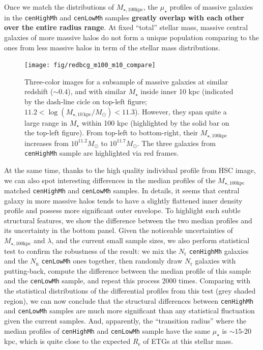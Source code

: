 \documentclass{emulateapj}
\def\rbcg{\texttt{cenHighMh}}
\def\nbcg{\texttt{cenLowMh}}
\def\mstar{{$M_{\star}$}}
\def\mtot{{$M_{\star,100\mathrm{kpc}}$}}
\def\mden{{$\mu_{\star}$}}
\begin{document}
\begin{CJK*}{UTF8}{gbsn}
    Once we match the distributions of \mtot{}, the \mden{} profiles of massive 
    galaxies in the \rbcg{} and \nbcg{} samples \textbf{greatly overlap with each 
    other over the entire radius range}. 
    At fixed ``total'' stellar mass, massive central galaxies of more massive 
    halos do not form a unique population comparing to the ones from less massive 
    halos in term of the stellar mass distributions. 
    
  \begin{figure}[t!]
      \centering 
      \texttt{[image: fig/redbcg\_m100\_m10\_compare]}
      \caption{Three-color images for a subsample of massive galaxies at similar redshift
      		($\sim 0.4$), and with similar \mstar{} inside inner 10 kpc (indicated by the 
            dash-line cicle on top-left figure; 
            $11.2<\log (M_{\star,10\ \mathrm{kpc}}/M_{\odot})<11.3$). 
            However, they span quite a large range in \mstar{} within 100 kpc 
            (highlighted by the solid bar on the top-left figure). 
            From top-left to bottom-right, their \mtot{} increases from 
            $10^{11.2} M_{\odot}$ to $10^{11.7} M_{\odot}$.
            The three galaxies from \rbcg{} sample are highlighted via red frames.}
      \label{fig:m100_m10_color}
  \end{figure}
    
    At the same time, thanks to the high quality individual profile from HSC image, 
    we can also spot interesting differences in the median profiles of the \mtot{} 
    matched \rbcg{} and \nbcg{} samples.  
    In details, it seems that central galaxy in more massive halos tends to have 
    a slightly flattened inner density profile and possess more significant outer 
    envelope.   
    To highlight such subtle structural features, we show the difference between 
    the two median profiles and its uncertainty in the bottom panel. 
    Given the noticeable uncertainties of \mtot{} and $\lambda$, and the current small 
    sample sizes, we also perform statistical test to confirm the robustness of the
    result: we mix the $N_{\mathrm{r}}$ \rbcg{} galaxies and the $N_{\mathrm{n}}$ \nbcg{}
    ones together, then randomly draw $N_{\mathrm{r}}$ galaxies with putting-back, 
    compute the difference between the median profile of this sample and the \nbcg{} 
    sample, and repeat this process 2000 times.  
    Comparing with the statistical distributions of the differential profiles from 
    this test (grey shaded region), we can now conclude that the structural 
    differences between \rbcg{} and \nbcg{} samples are much more significant than 
    any statistical fluctuation given the current samples.  
    And, apparently, the ``transition radius'' where the median profiles of \rbcg{} 
    and \nbcg{} sample have the same \mden{} is $\sim 15$-20 kpc, which is quite 
    close to the expected $R_{\mathrm{e}}$ of ETGs at this stellar mass. 
       

\end{CJK*}
\end{document}
